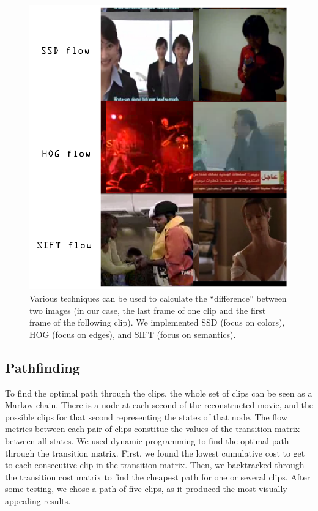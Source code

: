 \begin{figure}
\centering
    \includegraphics[width=1.0\columnwidth]{figures/lowflowstitled.png}
\caption{Various techniques can be used to calculate the ``difference'' between two images (in our case, the last frame of one clip and the first frame of the following clip).  We implemented SSD (focus on colors), HOG (focus on edges), and SIFT (focus on semantics).}
\label{fig:flows}
\end{figure}


\subsection{Pathfinding}
To find the optimal path through the clips, the whole set of clips can be seen as a Markov chain. There is a node at each second of the reconstructed movie, and the possible clips for that second representing the states of that node. The flow metrics between each pair of clips constitue the values of the transition matrix between all states. We used dynamic programming to find the optimal path through the transition matrix. First, we found the lowest cumulative cost to get to each consecutive clip in the transition matrix. Then, we backtracked through the transition cost matrix to find the cheapest path for one or several clips. After some testing, we chose a path of five clips, as it produced the most visually appealing results.

